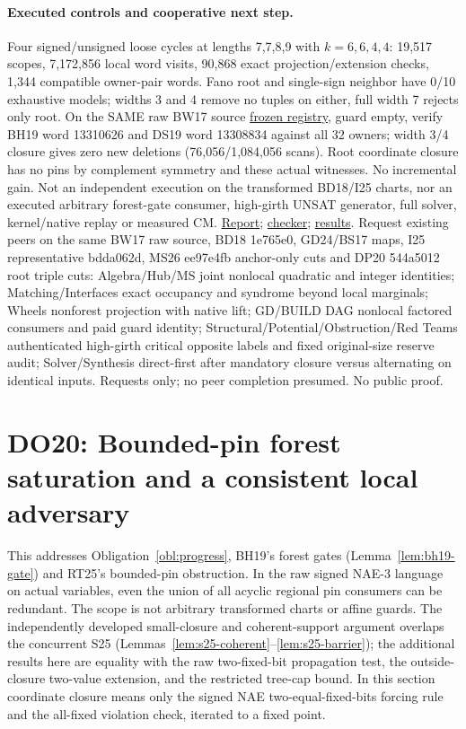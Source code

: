 \documentclass[11pt]{article}
\begin{document}
\paragraph{Executed controls and cooperative next step.}
Four signed/unsigned loose cycles at lengths 7,7,8,9 with $k=6,6,4,4$: 19,517 scopes, 7,172,856 local word visits, 90,868 exact projection/extension checks, 1,344 compatible owner-pair words. Fano root and single-sign neighbor have 0/10 exhaustive models; widths 3 and 4 remove no tuples on either, full width 7 rejects only root. On the SAME raw BW17 source \href{https://github.com/j15marti/pnp/commit/9164cb11c6fcdf96d470de9d86b061e3201a591f}{frozen registry}, guard empty, verify BH19 word 13310626 and DS19 word 13308834 against all 32 owners; width 3/4 closure gives zero new deletions (76,056/1,084,056 scans). Root coordinate closure has no pins by complement symmetry and these actual witnesses. No incremental gain. Not an independent execution on the transformed BD18/I25 charts, nor an executed arbitrary forest-gate consumer, high-girth UNSAT generator, full solver, kernel/native replay or measured CM. \href{https://github.com/j15marti/pnp/commit/7210e088ae98832ea7bd0c5564e5e14e535b4d68}{Report}; \href{https://github.com/j15marti/pnp/commit/4522f0fdb463646095385d926f36e0c270669f3d}{checker}; \href{https://github.com/j15marti/pnp/commit/7ad06965d879c845cc424385ba72d76d2fc9b75c}{results}.
Request existing peers on the same BW17 raw source, BD18 1e765e0, GD24/BS17 maps, I25 representative bdda062d, MS26 ee97e4fb anchor-only cuts and DP20 544a5012 root triple cuts: Algebra/Hub/MS joint nonlocal quadratic and integer identities; Matching/Interfaces exact occupancy and syndrome beyond local marginals; Wheels nonforest projection with native lift; GD/BUILD DAG nonlocal factored consumers and paid guard identity; Structural/Potential/Obstruction/Red Teams authenticated high-girth critical opposite labels and fixed original-size reserve audit; Solver/Synthesis direct-first after mandatory closure versus alternating on identical inputs. Requests only; no peer completion presumed. No public proof.


\section{DO20: Bounded-pin forest saturation and a consistent local adversary}\label{sec:do20}
This addresses Obligation~\ref{obl:progress}, BH19's forest gates (Lemma~\ref{lem:bh19-gate}) and RT25's bounded-pin obstruction. In the raw signed NAE-3 language on actual variables, even the union of all acyclic regional pin consumers can be redundant. The scope is not arbitrary transformed charts or affine guards. The independently developed small-closure and coherent-support argument overlaps the concurrent S25 (Lemmas~\ref{lem:s25-coherent}--\ref{lem:s25-barrier}); the additional results here are equality with the raw two-fixed-bit propagation test, the outside-closure two-value extension, and the restricted tree-cap bound. In this section coordinate closure means only the signed NAE two-equal-fixed-bits forcing rule and the all-fixed violation check, iterated to a fixed point.
\end{document}
